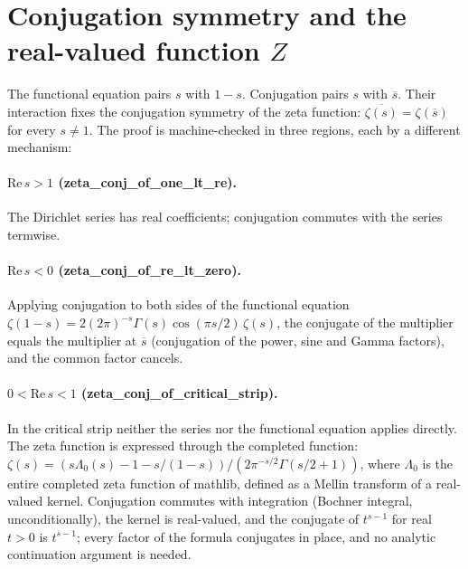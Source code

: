 \documentclass[sigplan,10pt,anonymous,review]{acmart}
\begin{document}
\section{Conjugation symmetry and the real-valued function $Z$}

The functional equation pairs $s$ with $1-s$. Conjugation pairs $s$
with $\overline{s}$. Their interaction fixes the conjugation symmetry
of the zeta function: $\overline{\zeta(s)} = \zeta(\overline{s})$
for every $s \neq 1$. The proof is machine-checked in three regions,
each by a different mechanism:

\paragraph{$\mathrm{Re}\,s > 1$ (zeta\_conj\_of\_one\_lt\_re).} The
Dirichlet series has real coefficients; conjugation commutes with the
series termwise.

\paragraph{$\mathrm{Re}\,s < 0$ (zeta\_conj\_of\_re\_lt\_zero).}
Applying conjugation to both sides of the functional equation
$\zeta(1-s) = 2(2\pi)^{-s}\Gamma(s)\cos(\pi s/2)\,\zeta(s)$, the
conjugate of the multiplier equals the multiplier at $\overline{s}$
(conjugation of the power, sine and Gamma factors), and the common
factor cancels.

\paragraph{$0 < \mathrm{Re}\,s < 1$ (zeta\_conj\_of\_critical\_strip).}
In the critical strip neither the series nor the functional equation
applies directly. The zeta function is expressed through the completed
function: $\zeta(s) = (s\Lambda_0(s) - 1 - s/(1-s)) /
(2\pi^{-s/2}\Gamma(s/2+1))$, where $\Lambda_0$ is the entire
completed zeta function of mathlib, defined as a Mellin transform of a
real-valued kernel. Conjugation commutes with integration (Bochner
integral, unconditionally), the kernel is real-valued, and the
conjugate of $t^{s-1}$ for real $t > 0$ is $t^{\overline{s}-1}$;
every factor of the formula conjugates in place, and no analytic
continuation argument is needed.
\end{document}
